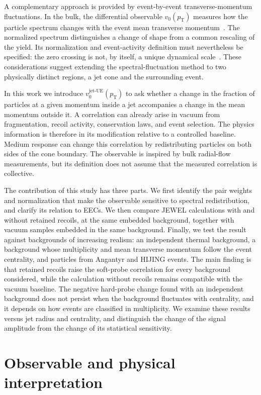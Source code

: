 \documentclass[aps,prc,twocolumn,superscriptaddress,nofootinbib,longbibliography,floatfix,10pt]{revtex4-2}
\newcommand{\pT}{p_{\mathrm T}}
\newcommand{\vjet}{{v_0^{\mathrm{jet\text{-}UE}}}}
\begin{document}
A complementary approach is provided by event-by-event transverse-momentum fluctuations. In the bulk, the differential observable $v_0(\pT)$ measures how the particle spectrum changes with the event mean transverse momentum~\cite{Schenke,ATLASv0,ALICEv0}. The normalized spectrum distinguishes a change of shape from a common rescaling of the yield. Its normalization and event-activity definition must nevertheless be specified: the zero crossing is not, by itself, a unique dynamical scale~\cite{BhattaShape}. These considerations suggest extending the spectral-fluctuation method to two physically distinct regions, a jet cone and the surrounding event.

In this work we introduce $\vjet(\pT)$ to ask whether a change in the fraction of particles at a given momentum inside a jet accompanies a change in the mean momentum outside it. A correlation can already arise in vacuum from fragmentation, recoil activity, conservation laws, and event selection. The physics information is therefore in its modification relative to a controlled baseline. Medium response can change this correlation by redistributing particles on both sides of the cone boundary. The observable is inspired by bulk radial-flow measurements, but its definition does not assume that the measured correlation is collective.

The contribution of this study has three parts. We first identify the pair weights and normalization that make the observable sensitive to spectral redistribution, and clarify its relation to EECs. We then compare JEWEL calculations with and without retained recoils, at the same embedded background, together with vacuum samples embedded in the same background. Finally, we test the result against backgrounds of increasing realism: an independent thermal background, a background whose multiplicity and mean transverse momentum follow the event centrality, and particles from Angantyr and HIJING events. The main finding is that retained recoils raise the soft-probe correlation for every background considered, while the calculation without recoils remains compatible with the vacuum baseline. The negative hard-probe change found with an independent background does not persist when the background fluctuates with centrality, and it depends on how events are classified in multiplicity. We examine these results versus jet radius and centrality, and distinguish the change of the signal amplitude from the change of its statistical sensitivity.

\section{Observable and physical interpretation}\label{sec:observable}
\end{document}
